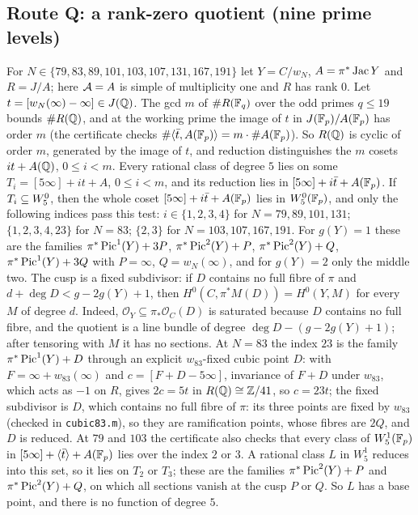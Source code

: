 \subsection{Route Q: a rank-zero quotient (nine prime levels)}
For $N\in\{79,83,89,\allowbreak 101,103,107,\allowbreak 131,167,191\}$ let $Y=C/w_N$, $A=\pi^*\operatorname{Jac} Y$ and $R=J/A$; here $\mathcal{A}=A$ is simple
of multiplicity one and $R$ has rank $0$. Let $t=[w_N(\infty)-\infty]\in J(\mathbb{Q})$. The gcd $m$ of $\#R(\mathbb{F}_q)$ over
the odd primes $q\le19$ bounds $\#R(\mathbb{Q})$, and at the working prime the image of $t$ in $J(\mathbb{F}_p)/A(\mathbb{F}_p)$ has order $m$
(the certificate checks $\#\langle\bar t,A(\mathbb{F}_p)\rangle=m\cdot\#A(\mathbb{F}_p)$). So $R(\mathbb{Q})$ is cyclic of order $m$, generated by
the image of $t$, and reduction distinguishes the $m$ cosets $it+A(\mathbb{Q})$, $0\le i<m$. Every rational class of degree $5$ lies on some $T_i=[5\infty]+it+A$, $0\le i<m$, and its reduction lies in
$[5\infty]+i\bar t+A(\mathbb{F}_p)$. If $T_i\subseteq W^0_5$, then the whole coset $[5\infty]+i\bar t+A(\mathbb{F}_p)$ lies in $W^0_5(\mathbb{F}_p)$,
and only the following indices pass this test: $i\in\{1,2,3,4\}$ for $N=79,89,101,131$; $\{1,2,3,4,23\}$ for $N=83$;
$\{2,3\}$ for $N=103,107,167,191$. For $g(Y)=1$ these are the families
$\pi^*\operatorname{Pic}^1(Y)+3P$, $\pi^*\operatorname{Pic}^2(Y)+P$, $\pi^*\operatorname{Pic}^2(Y)+Q$, $\pi^*\operatorname{Pic}^1(Y)+3Q$ with $P=\infty$,
$Q=w_N(\infty)$, and for $g(Y)=2$ only the middle two. The cusp is a fixed subdivisor: if $D$ contains no full
fibre of $\pi$ and $d+\deg D<g-2g(Y)+1$, then $H^0(C,\pi^*M(D))=H^0(Y,M)$ for every $M$ of degree $d$. Indeed,
$\mathcal O_Y\subseteq\pi_*\mathcal O_C(D)$ is saturated because $D$ contains no full fibre, and the quotient is a line
bundle of degree $\deg D-(g-2g(Y)+1)$; after tensoring with $M$ it has no sections. At
$N=83$ the index $23$ is the family $\pi^*\operatorname{Pic}^1(Y)+D$ through an explicit $w_{83}$-fixed cubic point $D$: with
$F=\infty+w_{83}(\infty)$ and $c=[F+D-5\infty]$, invariance of $F+D$ under $w_{83}$, which acts as $-1$ on $R$,
gives $2c=5t$ in $R(\mathbb{Q})\cong\mathbb{Z}/41$, so $c=23t$; the fixed subdivisor is $D$, which contains no full fibre of $\pi$:
its three points are fixed by $w_{83}$ (checked in \texttt{cubic83.m}), so they are ramification points, whose fibres
are $2Q$, and $D$ is reduced. At $79$ and $103$ the certificate also checks that every class of $W^1_5(\mathbb{F}_p)$ in
$[5\infty]+\langle\bar t\rangle+A(\mathbb{F}_p)$ lies over the index $2$ or $3$. A rational class $L$ in $W^1_5$ reduces into
this set, so it lies on $T_2$ or $T_3$; these are the families $\pi^*\operatorname{Pic}^2(Y)+P$ and $\pi^*\operatorname{Pic}^2(Y)+Q$, on which
all sections vanish at the cusp $P$ or $Q$. So $L$ has a base point, and there is no function of degree $5$.

